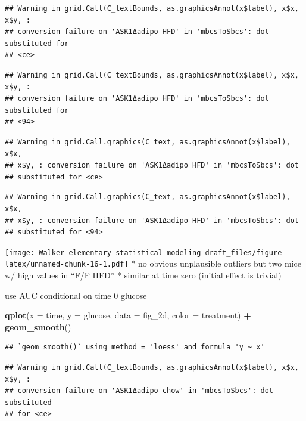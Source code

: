 \documentclass[]{book}
\newenvironment{Shaded}{\begin{snugshade}}{\end{snugshade}}
\newcommand{\DataTypeTok}[1]{\textcolor[rgb]{0.13,0.29,0.53}{#1}}
\newcommand{\KeywordTok}[1]{\textcolor[rgb]{0.13,0.29,0.53}{\textbf{#1}}}
\newcommand{\NormalTok}[1]{#1}
\newcommand{\OperatorTok}[1]{\textcolor[rgb]{0.81,0.36,0.00}{\textbf{#1}}}
\newcommand{\StringTok}[1]{\textcolor[rgb]{0.31,0.60,0.02}{#1}}
\begin{document}
\begin{verbatim}
## Warning in grid.Call(C_textBounds, as.graphicsAnnot(x$label), x$x, x$y, :
## conversion failure on 'ASK1Δadipo HFD' in 'mbcsToSbcs': dot substituted for
## <ce>
\end{verbatim}

\begin{verbatim}
## Warning in grid.Call(C_textBounds, as.graphicsAnnot(x$label), x$x, x$y, :
## conversion failure on 'ASK1Δadipo HFD' in 'mbcsToSbcs': dot substituted for
## <94>
\end{verbatim}

\begin{verbatim}
## Warning in grid.Call.graphics(C_text, as.graphicsAnnot(x$label), x$x,
## x$y, : conversion failure on 'ASK1Δadipo HFD' in 'mbcsToSbcs': dot
## substituted for <ce>
\end{verbatim}

\begin{verbatim}
## Warning in grid.Call.graphics(C_text, as.graphicsAnnot(x$label), x$x,
## x$y, : conversion failure on 'ASK1Δadipo HFD' in 'mbcsToSbcs': dot
## substituted for <94>
\end{verbatim}

\texttt{[image: Walker-elementary-statistical-modeling-draft\_files/figure-latex/unnamed-chunk-16-1.pdf]}
* no obvious unplausible outliers but two mice w/ high values in ``F/F HFD''
* similar at time zero (initial effect is trivial)

use AUC conditional on time 0 glucose

\begin{Shaded}
\begin{Highlighting}[]
\KeywordTok{qplot}\NormalTok{(}\DataTypeTok{x =}\NormalTok{ time,}
      \DataTypeTok{y =}\NormalTok{ glucose,}
      \DataTypeTok{data =}\NormalTok{ fig_2d,}
      \DataTypeTok{color =}\NormalTok{ treatment) }\OperatorTok{+}
\StringTok{  }\KeywordTok{geom_smooth}\NormalTok{()}
\end{Highlighting}
\end{Shaded}

\begin{verbatim}
## `geom_smooth()` using method = 'loess' and formula 'y ~ x'
\end{verbatim}

\begin{verbatim}
## Warning in grid.Call(C_textBounds, as.graphicsAnnot(x$label), x$x, x$y, :
## conversion failure on 'ASK1Δadipo chow' in 'mbcsToSbcs': dot substituted
## for <ce>
\end{verbatim}
\end{document}
